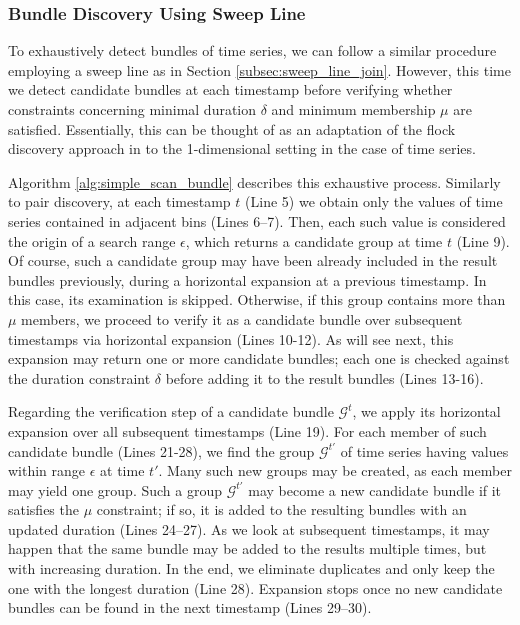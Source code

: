 \subsubsection{Bundle Discovery Using Sweep Line}
\label{subsec:sweepline_bundle}
To exhaustively detect bundles of time series, we can follow a similar procedure employing a sweep line as in Section \ref{subsec:sweep_line_join}. However, this time we detect candidate bundles at each timestamp before verifying whether constraints concerning minimal duration $\delta$ and minimum membership $\mu$ are satisfied. Essentially, this can be thought of as an adaptation of the flock discovery approach in \cite{vieira2009line} to the 1-dimensional setting in the case of time series.

Algorithm \ref{alg:simple_scan_bundle} describes this exhaustive process. Similarly to pair discovery, at each timestamp $t$ (Line 5) we obtain only the values of time series contained in adjacent bins (Lines 6--7). Then, each such value is considered the origin of a search range $\epsilon$, which returns a candidate group at time $t$ (Line 9). Of course, such a candidate group may have been already included in the result bundles previously, during a horizontal expansion at a previous timestamp. In this case, its examination is skipped. Otherwise, if this group contains more than $\mu$ members, we proceed to verify it as a candidate bundle over subsequent timestamps via horizontal expansion (Lines 10-12). As will see next, this expansion may return one or more candidate bundles; each one is checked against the duration constraint $\delta$ before adding it to the result bundles (Lines 13-16).

Regarding the verification step of a candidate bundle $\mathcal{G}^t$, we apply its horizontal expansion over all subsequent timestamps (Line 19). For each member of such candidate bundle (Lines 21-28), we find the group $\mathcal{G}^{t'}$ of time series having values within range $\epsilon$ at time $t'$. Many such new groups may be created, as each member may yield one group. Such a group $\mathcal{G}^{t'}$ may become a new candidate bundle if it satisfies the $\mu$ constraint; if so, it is added to the resulting bundles with an updated duration (Lines 24--27). As we look at subsequent timestamps, it may happen that the same bundle may be added to the results multiple times, but with increasing duration. In the end, we eliminate duplicates and only keep the one with the longest duration (Line 28). Expansion stops once no new candidate bundles can be found in the next timestamp (Lines 29--30).

